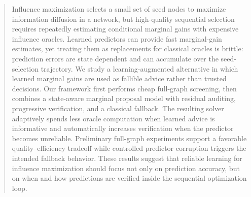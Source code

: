 \begin{abstract}
Influence maximization selects a small set of seed nodes to maximize information diffusion in a network, but high-quality sequential selection requires repeatedly estimating conditional marginal gains with expensive influence oracles. Learned predictors can provide fast marginal-gain estimates, yet treating them as replacements for classical oracles is brittle: prediction errors are state dependent and can accumulate over the seed-selection trajectory. We study a learning-augmented alternative in which learned marginal gains are used as fallible advice rather than trusted decisions. Our framework first performs cheap full-graph screening, then combines a state-aware marginal proposal model with residual auditing, progressive verification, and a classical fallback. The resulting solver adaptively spends less oracle computation when learned advice is informative and automatically increases verification when the predictor becomes unreliable. Preliminary full-graph experiments support a favorable quality--efficiency tradeoff while controlled predictor corruption triggers the intended fallback behavior. These results suggest that reliable learning for influence maximization should focus not only on prediction accuracy, but on when and how predictions are verified inside the sequential optimization loop.
\end{abstract}
